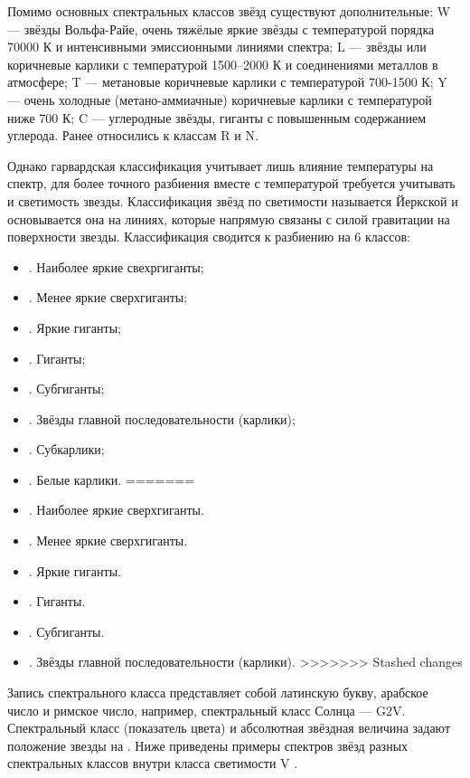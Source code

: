 Помимо основных спектральных классов звёзд существуют дополнительные: W — звёзды Вольфа-Райе, очень тяжёлые яркие звёзды с температурой порядка 70000 К и интенсивными эмиссионными линиями спектра; L — звёзды или коричневые карлики с температурой 1500–2000 К и соединениями металлов в атмосфере; T — метановые коричневые карлики с температурой 700-1500 К; Y — очень холодные (метано-аммиачные) коричневые карлики с температурой ниже 700 К; C — углеродные звёзды, гиганты с повышенным содержанием углерода. Ранее относились к классам R и N.

Однако гарвардская классификация учитывает лишь влияние температуры на спектр, для более точного разбиения вместе с температурой требуется учитывать и светимость звезды. Классификация звёзд по светимости называется Йеркской и основывается она на линиях, которые напрямую связаны с силой гравитации на поверхности звезды. Классификация сводится к разбиению на 6 классов:
\begin{itemize}
<<<<<<< Updated upstream
	\item {}. Наиболее яркие свехргиганты;
	\item {}. Менее яркие сверхгиганты;
	\item {}. Яркие гиганты;
	\item {}. Гиганты;
	\item {}. Субгиганты;
	\item {}. Звёзды главной последовательности (карлики);
	\item {}. Субкарлики;
	\item {}. Белые карлики.
=======
	\item {}. Наиболее яркие сверхгиганты.
	\item {}. Менее яркие сверхгиганты.
	\item {}. Яркие гиганты.
	\item {}. Гиганты.
	\item {}. Субгиганты.
	\item {}. Звёзды главной последовательности (карлики).
>>>>>>> Stashed changes
\end{itemize}
Запись спектрального класса представляет собой латинскую букву, арабское число и римское число, например, спектральный класс Солнца — G2V. Спектральный класс (показатель цвета) и абсолютная звёздная величина задают положение звезды на . Ниже приведены примеры спектров звёзд разных спектральных классов внутри класса светимости V .
